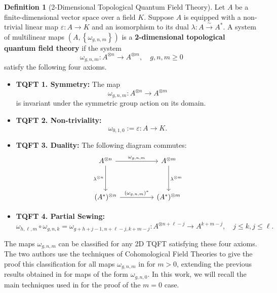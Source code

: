 \documentclass{amsart}
\newcommand{\be}{\begin{equation}}
\newcommand{\ee}{\end{equation}}
\newcommand{\tensor}{\otimes}
\newcommand{\Atn}{A^{\tensor n}}
\newcommand{\Atm}{A^{\tensor m}}
\newcommand{\eps}{\varepsilon}
\theoremstyle{definition}
\newtheorem{Def}[Lem]{Definition}
\begin{document}
\begin{Def}[2-Dimensional Topological Quantum Field Theory]\label{tqft definition}
	 Let $A$ be a finite-dimensional vector space over a field $K$. Suppose $A$ is equipped with a non-trivial linear map $\eps:A\longrightarrow K$ and an isomorphism to its dual $\lambda:A\stackrel{\sim}{\longrightarrow} A^*$. A system of multilinear maps $\left(A,\left\{\omega_{g,n,m}\right\}\right)$ is a \textbf{2-dimensional topological quantum field theory} if the system $$\omega_{g,n,m}:\Atn\longrightarrow\Atm,\quad g,n,m\geq0$$satisfy the following four axioms.
    \begin{itemize}
        \item \textbf{TQFT 1. Symmetry:} The map \be
        \omega_{g,n,m}: \Atn\longrightarrow \Atm 
        \ee
        is invariant under the symmetric group action on its domain.
        \item \textbf{TQFT 2. Non-triviality: }\be
        \omega_{0,1,0}:=\eps:A\longrightarrow K.
        \ee

        \item \textbf{TQFT 3. Duality: }The following diagram commutes:
        \be
\begin{tikzcd}
A^{\otimes n} \arrow[dd, "\lambda^{\otimes n}"'] \arrow[rr, "{\omega_{g,n,m}}"] &  & A^{\otimes m} \arrow[dd, "\lambda^{\otimes m}"] \\
                                                                                &  &                                                 \\
(A^*)^{\otimes n} \arrow[rr, "{(\omega_{g,n,m})^*}"]                            &  & (A^*)^{\otimes m}                              
\end{tikzcd}
        \ee

    \item \textbf{TQFT 4. Partial Sewing: }\be
\omega_{h,\ell,m}\circ\omega_{g,n,k}=\omega_{g+h+j-1,n+\ell-j,k+m-j}:A^{\tensor n+\ell-j}\longrightarrow A^{k+m-j},\quad j\leq k,j\leq\ell.
    \ee
    \end{itemize}
\end{Def}

\noindent The maps $\omega_{g,n,m}$ can be classified for any 2D TQFT satisfying these four axioms. The two authors use the techniques of Cohomological Field Theories to give the proof this classification for all maps $\omega_{g,n,m}$ in \cite{DaDu} for $m>0$, extending the previous results obtained in \cite{DM_invitation} for maps of the form $\omega_{g,n,0}$. In this work, we will recall the main techniques used in \cite{DM_invitation} for the proof of the $m=0$ case. 
\end{document}
